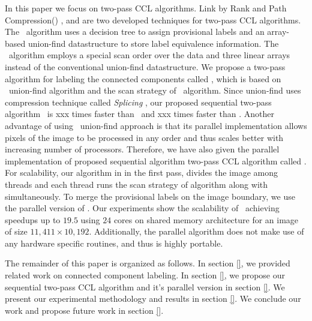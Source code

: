 In this paper we focus on two-pass CCL algorithms. Link by Rank and Path Compression(\lrpc) \cite{}, and \arun \cite{}
are two developed techniques for two-pass CCL algorithms.
The \lrpc\ algorithm uses a decision tree to assign provisional labels and an array-based union-find datastructure
to store label equivalence information. The \arun\ algorithm employs a special scan order over the data and three linear
arrays instead of the conventional union-find datastructure. 
We propose a two-pass algorithm for labeling the connected components called \aremsp, which is based on \rems\ union-find algorithm \cite{}
and the scan strategy of \arun\ algorithm. Since \rems union-find uses compression technique called {\em Splicing} \cite{},
our proposed sequential two-pass algorithm \aremsp\ is xxx times faster than \lrpc\ and xxx times faster than \arun.
Another advantage of using \rems\ union-find approach is that its parallel implementation allows pixels of the image to be
processed in any order and thus scales better with increasing number of processors. Therefore, we have also given the parallel implementation of proposed
sequential algorithm two-pass CCL algorithm called \paremsp. For scalability, our algorithm in in the first pass, divides the image among threads
and each thread runs the scan strategy of \arun algorithm along with \remsp simultaneously. To merge the provisional labels on the image boundary,
we use the parallel version of \remsp \cite{}. Our experiments show the scalability of \paremsp\ achieving speedups up to $19.5$ using $24$ cores
on shared memory architecture for an image of size $11,411 \times 10,192$.
Additionally, the parallel algorithm does not make use of any hardware specific routines, and thus is highly portable.

The remainder of this paper is organized as follows. In section \ref{}, we provided related work on connected component labeling.
In section \ref{}, we propose our sequential two-pass CCL algorithm \aremsp and it's parallel version in section \ref{}. We present our experimental
methodology and results in section \ref{}. We conclude our work
and propose future work in section \ref{}.


